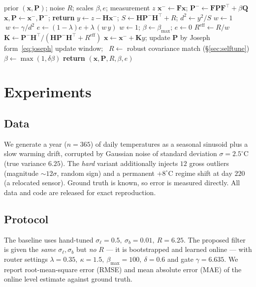 \documentclass[10pt,twocolumn]{article}
\newcommand{\vx}{\mathbf{x}}
\newcommand{\mF}{\mathbf{F}}
\newcommand{\mH}{\mathbf{H}}
\newcommand{\mP}{\mathbf{P}}
\newcommand{\mQ}{\mathbf{Q}}
\newcommand{\mK}{\mathbf{K}}
\newcommand{\Rmeas}{R}
\begin{document}
\begin{algorithm}[t]
\caption{Adaptive robust local-linear-trend filter (one step)}
\label{alg:main}
\small
\begin{algorithmic}[1]
\Require prior $(\vx,\mP)$; noise $\Rmeas$; scales $\beta,e$; measurement $z$
\State $\vx^- \gets \mF\vx$; \quad $\mP^- \gets \mF\mP\mF^\top + \beta\mQ$ 
 \State $\vx,\mP \gets \vx^-,\mP^-$; \textbf{return}
\EndIf
\State $y \gets z - \mH\vx^-$; \quad $S \gets \mH\mP^-\mH^\top + \Rmeas$; \quad $d^2 \gets y^2/S$
 $w \gets 1$ 
\Else{} $\ w \gets \gamma/d^2$ 
\EndIf
\State $e \gets (1-\lambda)e + \lambda\,(w\,y)$ 
\If{$|e| > \kappa\sqrt{\Rmeas}$} 
   \State $w \gets 1$; \quad $\beta \gets \beta_{\max}$; \quad $e \gets 0$
\EndIf
\State $\Rmeas^{\mathrm{eff}} \gets \Rmeas / w$
\State $\mK \gets \mP^-\mH^\top / (\mH\mP^-\mH^\top + \Rmeas^{\mathrm{eff}})$
\State $\vx \gets \vx^- + \mK y$; \quad update $\mP$ by Joseph form~\eqref{eq:joseph}
\State update window; \ $\Rmeas \gets$ robust covariance match (\S\ref{sec:selftune})
\State $\beta \gets \max(1,\delta\beta)$ 
\State \textbf{return} $(\vx,\mP,\Rmeas,\beta,e)$
\end{algorithmic}
\end{algorithm}

\section{Experiments}
\label{sec:experiments}
\subsection{Data}
We generate a year ($n=365$) of daily temperatures as a seasonal sinusoid plus a
slow warming drift, corrupted by Gaussian noise of standard deviation
$\sigma=2.5^\circ$C (true variance $6.25$). The \emph{hard} variant additionally
injects $12$ gross outliers (magnitude $\sim\!12\sigma$, random sign) and a
permanent $+8^\circ$C regime shift at day $220$ (a relocated sensor). Ground
truth is known, so error is measured directly. All data and code are released for
exact reproduction.

\subsection{Protocol}
The baseline uses hand-tuned $\sigma_\ell=0.5,\ \sigma_b=0.01,\ \Rmeas=6.25$. The
proposed filter is given the \emph{same} $\sigma_\ell,\sigma_b$ but \emph{no}
$\Rmeas$ --- it is bootstrapped and learned online --- with router settings
$\lambda=0.35,\ \kappa=1.5,\ \beta_{\max}=100,\ \delta=0.6$ and gate
$\gamma=6.635$. We report root-mean-square error (RMSE) and mean absolute error
(MAE) of the online level estimate against ground truth.
\end{document}

